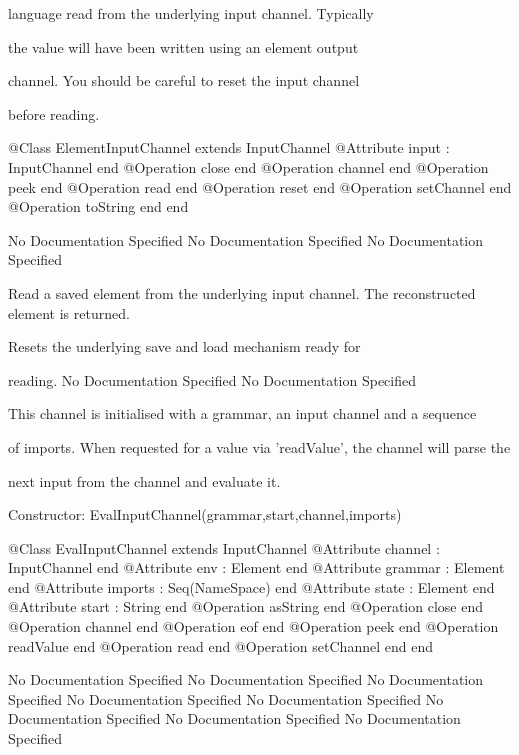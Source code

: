       language read from the underlying input channel. Typically

      the value will have been written using an element output

      channel. You should be careful to reset the input channel

      before reading.
\begin{Interface}
@Class ElementInputChannel extends InputChannel
  @Attribute input : InputChannel end
  @Operation close end
  @Operation channel end
  @Operation peek end
  @Operation read end
  @Operation reset end
  @Operation setChannel end
  @Operation toString end
end
\end{Interface}
No Documentation Specified
No Documentation Specified
No Documentation Specified

        Read a saved element from the underlying input channel.
        The reconstructed element is returned.

        Resets the underlying save and load mechanism ready for

        reading.
No Documentation Specified
No Documentation Specified

      This channel is initialised with a grammar, an input channel and a sequence

      of imports. When requested for a value via 'readValue', the channel will parse the

      next input from the channel and evaluate it.
      
      Constructor: EvalInputChannel(grammar,start,channel,imports)
\begin{Interface}
@Class EvalInputChannel extends InputChannel
  @Attribute channel : InputChannel end
  @Attribute env : Element end
  @Attribute grammar : Element end
  @Attribute imports : Seq(NameSpace) end
  @Attribute state : Element end
  @Attribute start : String end
  @Operation asString end
  @Operation close end
  @Operation channel end
  @Operation eof end
  @Operation peek end
  @Operation readValue end
  @Operation read end
  @Operation setChannel end
end
\end{Interface}
No Documentation Specified
No Documentation Specified
No Documentation Specified
No Documentation Specified
No Documentation Specified
No Documentation Specified
No Documentation Specified
No Documentation Specified

